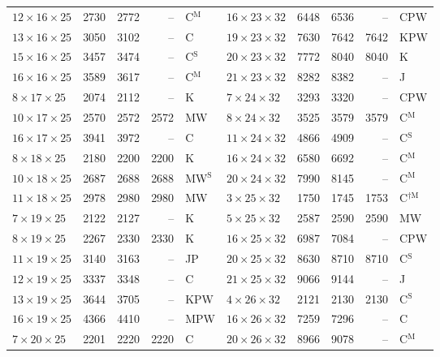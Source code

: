 \begin{longtable}{@{}lrrrl@{\hspace{6mm}}lrrrl@{}}
$12{\times}16{\times}25$ & 2730 & 2772 & -- & C$^{\mathrm{M}}$ & $16{\times}23{\times}32$ & 6448 & 6536 & -- & CPW\\
$13{\times}16{\times}25$ & 3050 & 3102 & -- & C & $19{\times}23{\times}32$ & 7630 & 7642 & 7642 & KPW\\
$15{\times}16{\times}25$ & 3457 & 3474 & -- & C$^{\mathrm{S}}$ & $20{\times}23{\times}32$ & 7772 & 8040 & 8040 & K\\
$16{\times}16{\times}25$ & 3589 & 3617 & -- & C$^{\mathrm{M}}$ & $21{\times}23{\times}32$ & 8282 & 8382 & -- & J\\
$8{\times}17{\times}25$ & 2074 & 2112 & -- & K & $7{\times}24{\times}32$ & 3293 & 3320 & -- & CPW\\
$10{\times}17{\times}25$ & 2570 & 2572 & 2572 & MW & $8{\times}24{\times}32$ & 3525 & 3579 & 3579 & C$^{\mathrm{M}}$\\
$16{\times}17{\times}25$ & 3941 & 3972 & -- & C & $11{\times}24{\times}32$ & 4866 & 4909 & -- & C$^{\mathrm{S}}$\\
$8{\times}18{\times}25$ & 2180 & 2200 & 2200 & K & $16{\times}24{\times}32$ & 6580 & 6692 & -- & C$^{\mathrm{M}}$\\
$10{\times}18{\times}25$ & 2687 & 2688 & 2688 & MW$^{\mathrm{S}}$ & $20{\times}24{\times}32$ & 7990 & 8145 & -- & C$^{\mathrm{M}}$\\
$11{\times}18{\times}25$ & 2978 & 2980 & 2980 & MW & $3{\times}25{\times}32$ & 1750 & 1745 & 1753 & C$^{\dagger\mathrm{M}}$\\
$7{\times}19{\times}25$ & 2122 & 2127 & -- & K & $5{\times}25{\times}32$ & 2587 & 2590 & 2590 & MW\\
$8{\times}19{\times}25$ & 2267 & 2330 & 2330 & K & $16{\times}25{\times}32$ & 6987 & 7084 & -- & CPW\\
$11{\times}19{\times}25$ & 3140 & 3163 & -- & JP & $20{\times}25{\times}32$ & 8630 & 8710 & 8710 & C$^{\mathrm{S}}$\\
$12{\times}19{\times}25$ & 3337 & 3348 & -- & C & $21{\times}25{\times}32$ & 9066 & 9144 & -- & J\\
$13{\times}19{\times}25$ & 3644 & 3705 & -- & KPW & $4{\times}26{\times}32$ & 2121 & 2130 & 2130 & C$^{\mathrm{S}}$\\
$16{\times}19{\times}25$ & 4366 & 4410 & -- & MPW & $16{\times}26{\times}32$ & 7259 & 7296 & -- & C\\
$7{\times}20{\times}25$ & 2201 & 2220 & 2220 & C & $20{\times}26{\times}32$ & 8966 & 9078 & -- & C$^{\mathrm{M}}$\\

\end{longtable}
